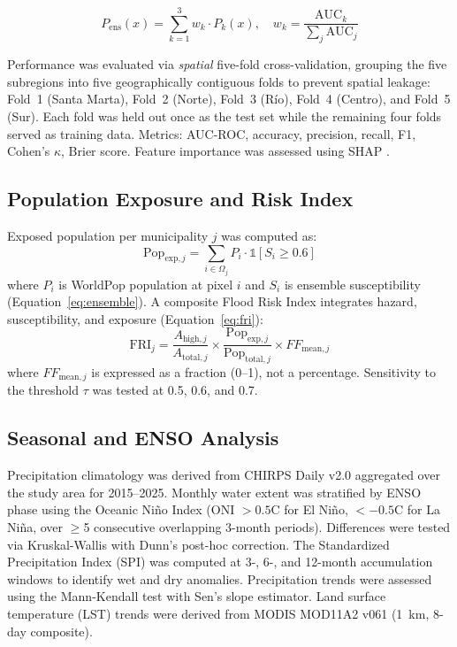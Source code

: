 \documentclass{article}
\begin{document}
\begin{equation}
    P_{\text{ens}}(x) = \sum_{k=1}^{3} w_k \cdot P_k(x), \quad w_k = \frac{\text{AUC}_k}{\sum_{j} \text{AUC}_j}
    \label{eq:ensemble}
\end{equation}

Performance was evaluated via \textit{spatial} five-fold cross-validation, grouping the five subregions into five geographically contiguous folds to prevent spatial leakage: Fold~1 (Santa Marta), Fold~2 (Norte), Fold~3 (R\'io), Fold~4 (Centro), and Fold~5 (Sur). Each fold was held out once as the test set while the remaining four folds served as training data. Metrics: AUC-ROC, accuracy, precision, recall, F1, Cohen's $\kappa$, Brier score. Feature importance was assessed using SHAP \citep{Lundberg2017}.

\subsection{Population Exposure and Risk Index}

Exposed population per municipality $j$ was computed as:
\begin{equation}
    \text{Pop}_{\text{exp},j} = \sum_{i \in \Omega_j} P_i \cdot \mathbb{1}[S_i \geq 0.6]
    \label{eq:pop_exposure}
\end{equation}
where $P_i$ is WorldPop population at pixel $i$ and $S_i$ is ensemble susceptibility (Equation~\ref{eq:ensemble}). A composite Flood Risk Index integrates hazard, susceptibility, and exposure (Equation~\ref{eq:fri}):
\begin{equation}
    \text{FRI}_j = \frac{A_{\text{high},j}}{A_{\text{total},j}} \times \frac{\text{Pop}_{\text{exp},j}}{\text{Pop}_{\text{total},j}} \times FF_{\text{mean},j}
    \label{eq:fri}
\end{equation}
where $FF_{\text{mean},j}$ is expressed as a fraction (0--1), not a percentage. Sensitivity to the threshold $\tau$ was tested at 0.5, 0.6, and 0.7.

\subsection{Seasonal and ENSO Analysis}

Precipitation climatology was derived from CHIRPS Daily v2.0 \citep{Funk2015} aggregated over the study area for 2015--2025. Monthly water extent was stratified by ENSO phase using the Oceanic Ni\~no Index (ONI $> 0.5$\textdegree{}C for El Ni\~no, $< -0.5$\textdegree{}C for La Ni\~na, over $\geq$5 consecutive overlapping 3-month periods). Differences were tested via Kruskal-Wallis with Dunn's post-hoc correction. The Standardized Precipitation Index (SPI) \citep{McKee1993} was computed at 3-, 6-, and 12-month accumulation windows to identify wet and dry anomalies. Precipitation trends were assessed using the Mann-Kendall test with Sen's slope estimator. Land surface temperature (LST) trends were derived from MODIS MOD11A2 v061 (\SI{1}{\kilo\metre}, 8-day composite).
\end{document}
